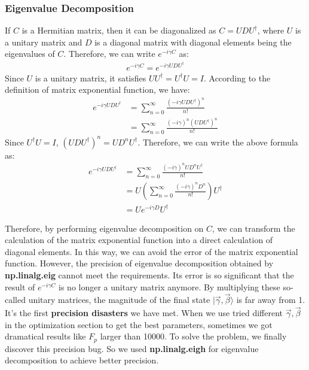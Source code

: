 \subsubsection{Eigenvalue Decomposition}
If $C$ is a Hermitian matrix, then it can be diagonalized as $C = UDU^\dagger$, where $U$ is a unitary matrix and $D$ is a diagonal matrix with diagonal elements being the eigenvalues of $C$. Therefore, we can write $e^{-i\gamma C}$ as:
\begin{align*}
    e^{-i\gamma C} = e^{-i\gamma UDU^\dagger}
\end{align*}
Since $U$ is a unitary matrix, it satisfies $UU^\dagger = U^\dagger U = I$. According to the definition of matrix exponential function, we have:
\begin{align*}
    e^{-i\gamma UDU^\dagger} &= \sum_{n=0}^{\infty} \frac{(-i\gamma UDU^\dagger)^n}{n!}\\
    &= \sum_{n=0}^{\infty} \frac{(-i\gamma)^n (UDU^\dagger)^n}{n!}
\end{align*}
Since $U^\dagger U = I$, $(UDU^\dagger)^n = UD^nU^\dagger$. Therefore, we can write the above formula as:
\begin{align*}
    e^{-i\gamma UDU^\dagger} &= \sum_{n=0}^{\infty} \frac{(-i\gamma)^n UD^nU^\dagger}{n!} \\
    &= U\left(\sum_{n=0}^{\infty} \frac{(-i\gamma)^n D^n}{n!}\right)U^\dagger \\
    &= Ue^{-i\gamma D}U^\dagger
\end{align*}

Therefore, by performing eigenvalue decomposition on $C$, we can transform the calculation of the matrix exponential function into a direct calculation of diagonal elements. In this way, we can avoid the error of the matrix exponential function. However, the precision of eigenvalue decomposition obtained by \textbf{np.linalg.eig} cannot meet the requirements. Its error is so significant that the result of $e^{-i\gamma C}$ is no longer a unitary matrix anymore. By multiplying these so-called unitary matrices, the magnitude of the final state $|\vec{\gamma}, \vec{\beta}\rangle $ is far away from 1. It's the first \textbf{precision disasters} we have met. When we use tried different $\vec{\gamma}, \vec{\beta} $ in the optimization section to get the best parameters, sometimes we got dramatical results like $F_p$ larger than 10000.  To solve the problem, we finally discover this precision bug.  So we used \textbf{np.linalg.eigh} for eigenvalue decomposition to achieve better precision. 




